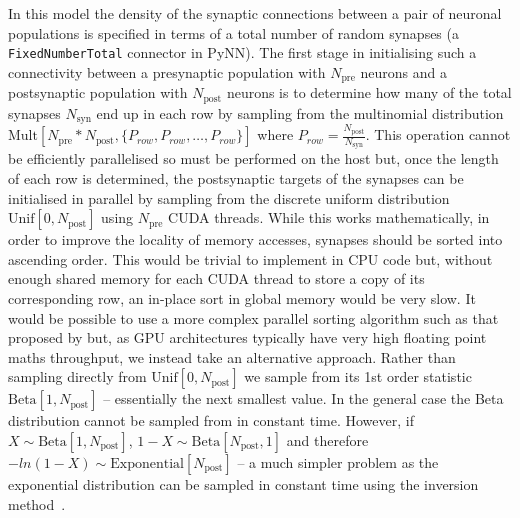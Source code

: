 \documentclass[utf8]{frontiersSCNS} %
\begin{document}
In this model the density of the synaptic connections between a pair of neuronal populations is specified in terms of a total number of random synapses (a \lstinline{FixedNumberTotal} connector in PyNN).
The first stage in initialising such a connectivity between a presynaptic population with $N_{\text{pre}}$ neurons and a postsynaptic population with $N_{\text{post}}$ neurons is to determine how many of the total synapses $N_{\text{syn}}$ end up in each row by sampling from the multinomial distribution $\text{Mult}[N_{\text{pre}} * N_{\text{post}}, \{P_{row}, P_{row}, \ldots, P_{row}\}]$ where $P_{row} = \frac{N_{\text{post}}}{N_{\text{syn}}}$.
This operation cannot be efficiently parallelised so must be performed on the host but, once the length of each row is determined, the postsynaptic targets of the synapses can be initialised in parallel by sampling from the discrete uniform distribution $\text{Unif}[0, N_{\text{post}}]$ using $N_{\text{pre}}$ CUDA threads.
While this works mathematically, in order to improve the locality of memory accesses, synapses should be sorted into ascending order.
This would be trivial to implement in CPU code but, without enough shared memory for each CUDA thread to store a copy of its corresponding row, an in-place sort in global memory would be very slow.
It would be possible to use a more complex parallel sorting algorithm such as that proposed by \citet{Awan2016} but, as GPU architectures typically have very high floating point maths throughput, we instead take an alternative approach.
Rather than sampling directly from $\text{Unif}[0, N_{\text{post}}]$ we sample from its 1st order statistic $\text{Beta}[1, N_{\text{post}}]$ -- essentially the next smallest value.
In the general case the Beta distribution cannot be sampled from in constant time.
However, if $X \sim \text{Beta}[1, N_{\text{post}}]$, $1 - X \sim \text{Beta}[N_{\text{post}}, 1]$ and therefore $-ln(1 - X) \sim \text{Exponential}[N_{\text{post}}]$ -- a much simpler problem as the exponential distribution can be sampled in constant time using the inversion method~\citep{DevroyeLuc2013}.
\end{document}
